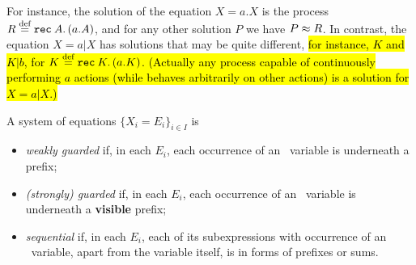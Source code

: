 


For instance, the solution of the equation 
$ X = a. X$ 
is  the process
$R \stackrel{\mbox{\scriptsize def}}{=} {\tt rec}\: A . \, (a. A)$, and for any other solution $P$ we have $P \approx R$.
In contrast, the equation 
 $X = a|  X$ has solutions that may be quite different, \hl{for instance,
 $K$ and $K | b$, for $K \stackrel{\mbox{\scriptsize def}}{=} {\tt rec}\: K . \, (a. K)$. (Actually any process capable of
continuously performing $a$ actions (while behaves arbitrarily on
other actions) is a solution for $X = a|  X$.)}
 



\begin{definition}
\label{def:guardness}
A system of equations 
$\{  X_i = E_i\}_{i\in I}$
 is 
\begin{itemize}
\item \emph{weakly guarded} if, in each $E_i$, each occurrence of
  an \behav\  variable is underneath a prefix;

\item \emph{(strongly) guarded} if, in each $E_i$, each occurrence of
  an \behav\  variable is underneath a \textbf{visible} prefix;

\item \emph{sequential} if, in each $E_i$, each of its subexpressions with occurrence of
  an \behav\  variable, apart from the variable itself, is in forms of
  prefixes or sums.
\end{itemize}
\end{definition}

